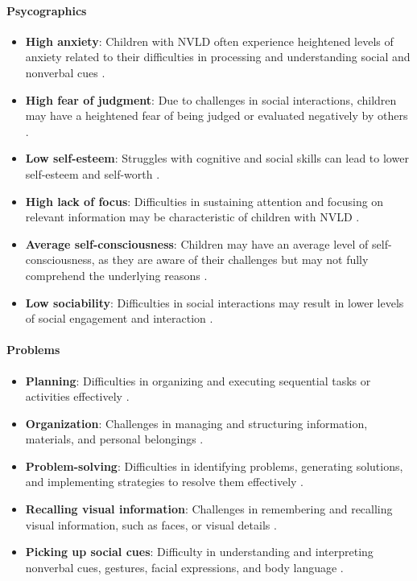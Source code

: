 \paragraph{Psycographics}
\begin{itemize}
    \item \textbf{High anxiety}: Children with NVLD often experience heightened levels of anxiety related to their difficulties in processing and understanding social and nonverbal cues \cite{understood_nvld_adult_2024}.
    \item \textbf{High fear of judgment}: Due to challenges in social interactions, children may have a heightened fear of being judged or evaluated negatively by others \cite{understood_nvld_adult_2024}.
    \item \textbf{Low self-esteem}: Struggles with cognitive and social skills can lead to lower self-esteem and self-worth \cite{understood_nvld_adult_2024}.
    \item \textbf{High lack of focus}: Difficulties in sustaining attention and focusing on relevant information may be characteristic of children with NVLD \cite{understood_nvld_2024}.
    \item \textbf{Average self-consciousness}: Children may have an average level of self-consciousness, as they are aware of their challenges but may not fully comprehend the underlying reasons \cite{understood_nvld_adult_2024}.
    \item \textbf{Low sociability}: Difficulties in social interactions may result in lower levels of social engagement and interaction \cite{understood_nvld_2024}.
\end{itemize}

\paragraph{Problems}
\begin{itemize}
    \item \textbf{Planning}: Difficulties in organizing and executing sequential tasks or activities effectively \cite{understood_nvld_adult_2024}.
    \item \textbf{Organization}: Challenges in managing and structuring information, materials, and personal belongings \cite{understood_nvld_adult_2024}.
    \item \textbf{Problem-solving}: Difficulties in identifying problems, generating solutions, and implementing strategies to resolve them effectively \cite{jama_nvld_2024}.
    \item \textbf{Recalling visual information}: Challenges in remembering and recalling visual information, such as faces, or visual details \cite{understood_nvld_2024}.
    \item \textbf{Picking up social cues}: Difficulty in understanding and interpreting nonverbal cues, gestures, facial expressions, and body language \cite{nationalLibraryMedicine}.
\end{itemize}

